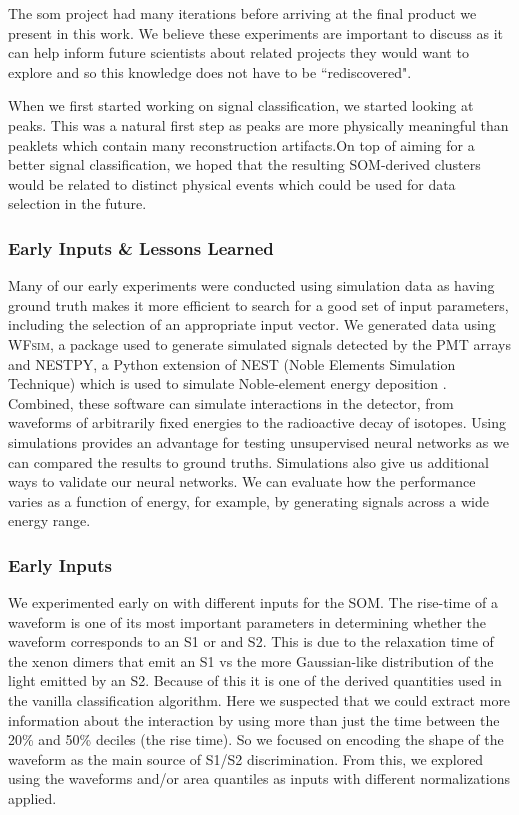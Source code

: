 The \acrshort{som} project had many iterations before arriving at the final product we present in this work. We believe these experiments are important to discuss as it can help inform future scientists about related projects they would want to explore and so this knowledge does not have to be ``rediscovered". 

When we first started working on signal classification, we started looking at peaks. This was a natural first step as peaks are more physically meaningful than peaklets which contain many reconstruction artifacts.On top of aiming for a better signal classification, we hoped that the resulting SOM-derived clusters would be related to distinct physical events which could be used for data selection in the future.


\subsubsection{Early Inputs \& Lessons Learned}

Many of our early experiments were conducted using simulation data as having ground truth makes it more efficient to search for a good set of input parameters, including the selection of an appropriate input vector. We generated data using \textsc{WFsim}, a package used to generate simulated signals detected by the PMT arrays \cite{wfsim} and \textsc{NESTPY}, a Python extension of \textsc{NEST} (Noble Elements Simulation Technique) which is used to simulate Noble-element energy deposition \cite{szydagis_m_2018_1314669}. Combined, these software can simulate interactions in the detector, from waveforms of arbitrarily fixed energies to the radioactive decay of isotopes. 
Using simulations provides an advantage for testing unsupervised neural networks as we can compared the results to ground truths. Simulations also give us additional ways to validate our neural networks. 
We can evaluate how the performance varies as a function of energy, for example, by generating signals across a wide energy range.


\subsubsection*{Early Inputs}

We experimented early on with different inputs for the SOM. The rise-time of a waveform is one of its most important parameters in determining whether the waveform corresponds to an S1 or and S2. This is due to the relaxation time of the xenon dimers that emit an S1 vs the more Gaussian-like distribution of the light emitted by an S2. Because of this it is one of the derived quantities used in the vanilla classification algorithm. Here we suspected that we could extract more information about the interaction by using more than just the time between the 20\% and 50\% deciles (the rise time). So we focused on encoding the shape of the waveform as the main source of S1/S2 discrimination. From this, we explored using the waveforms and/or area quantiles as inputs with different normalizations applied. 

